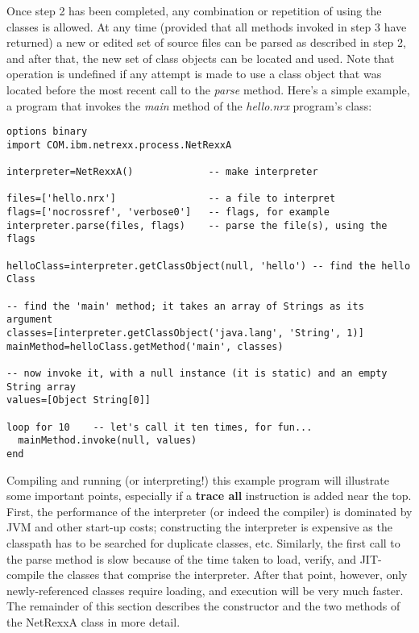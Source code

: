 Once step 2 has been completed, any combination or repetition of using
the classes is allowed.  At any time (provided that all methods invoked
in step 3 have returned) a new or edited set of source files can be
parsed as described in step 2, and after that, the new set of class
objects can be located and used.  Note that operation is undefined if
any attempt is made to use a class object that was located before the
most recent call to the \emph{parse} method.
\newline
Here's a simple example, a program that invokes the \emph{main} method
of the \emph{hello.nrx} program's class:
\begin{lstlisting}[label=netrexxa,caption=Try the NetRexxA interface]
options binary
import COM.ibm.netrexx.process.NetRexxA

interpreter=NetRexxA()             -- make interpreter

files=['hello.nrx']                -- a file to interpret
flags=['nocrossref', 'verbose0']   -- flags, for example
interpreter.parse(files, flags)    -- parse the file(s), using the flags

helloClass=interpreter.getClassObject(null, 'hello') -- find the hello Class

-- find the 'main' method; it takes an array of Strings as its argument
classes=[interpreter.getClassObject('java.lang', 'String', 1)]
mainMethod=helloClass.getMethod('main', classes)

-- now invoke it, with a null instance (it is static) and an empty String array
values=[Object String[0]]

loop for 10    -- let's call it ten times, for fun...
  mainMethod.invoke(null, values)
end
\end{lstlisting}

Compiling and running (or interpreting!) this example program will
illustrate some important points, especially if a \textbf{trace all}
instruction is added near the top.  First, the performance of the
interpreter (or indeed the compiler) is dominated by JVM and other
start-up costs; constructing the interpreter is expensive as the
classpath has to be searched for duplicate classes, etc.  Similarly,
the first call to the parse method is slow because of the time taken to
load, verify, and JIT-compile the classes that comprise the interpreter.
After that point, however, only newly-referenced classes require
loading, and execution will be very much faster.
\newline
The remainder of this section describes the constructor and the two
methods of the NetRexxA class in more detail.
